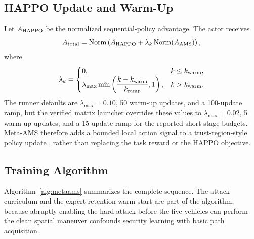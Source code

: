 \documentclass[lettersize,journal]{IEEEtran}
\begin{document}
\subsection{HAPPO Update and Warm-Up}
Let $A_{\rm HAPPO}$ be the normalized sequential-policy advantage. The actor receives
\begin{equation}
A_{\rm total}
=\operatorname{Norm}\left(
A_{\rm HAPPO}
+\lambda_k\operatorname{Norm}(A_{\rm AMS})
\right),
\label{eq:total_advantage}
\end{equation}
where
\begin{equation}
\lambda_k=
\begin{cases}
0,& k\leq k_{\rm warm},\\
\lambda_{\max}\min\left(\dfrac{k-k_{\rm warm}}{k_{\rm ramp}},1\right),& k>k_{\rm warm}.
\end{cases}
\label{eq:ramp}
\end{equation}
The runner defaults are $\lambda_{\max}=0.10$, 50 warm-up updates, and a 100-update ramp, but the verified matrix launcher overrides these values to $\lambda_{\max}=0.02$, 5 warm-up updates, and a 15-update ramp for the reported short stage budgets. Meta-AMS therefore adds a bounded local action signal to a trust-region-style policy update \cite{schulman2017proximal,yu2022surprising}, rather than replacing the task reward or the HAPPO objective.

\subsection{Training Algorithm}
Algorithm~\ref{alg:metaams} summarizes the complete sequence. The attack curriculum and the expert-retention warm start are part of the algorithm, because abruptly enabling the hard attack before the five vehicles can perform the clean spatial maneuver confounds security learning with basic path acquisition.
\end{document}
